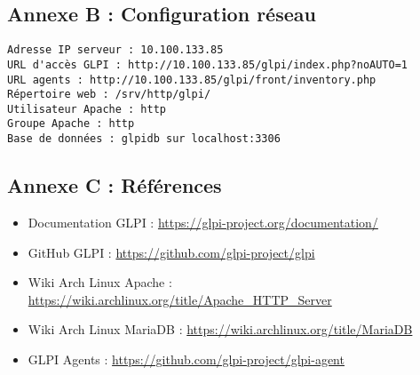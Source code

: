 \documentclass[12pt,a4paper]{article}
\begin{document}
\subsection{Annexe B : Configuration réseau}

\begin{lstlisting}[caption=Informations réseau de l'installation]
Adresse IP serveur : 10.100.133.85
URL d'accès GLPI : http://10.100.133.85/glpi/index.php?noAUTO=1
URL agents : http://10.100.133.85/glpi/front/inventory.php
Répertoire web : /srv/http/glpi/
Utilisateur Apache : http
Groupe Apache : http
Base de données : glpidb sur localhost:3306
\end{lstlisting}

\subsection{Annexe C : Références}

\begin{itemize}
    \item Documentation GLPI : \url{https://glpi-project.org/documentation/}
    \item GitHub GLPI : \url{https://github.com/glpi-project/glpi}
    \item Wiki Arch Linux Apache : \url{https://wiki.archlinux.org/title/Apache_HTTP_Server}
    \item Wiki Arch Linux MariaDB : \url{https://wiki.archlinux.org/title/MariaDB}
    \item GLPI Agents : \url{https://github.com/glpi-project/glpi-agent}
\end{itemize}
\end{document}
